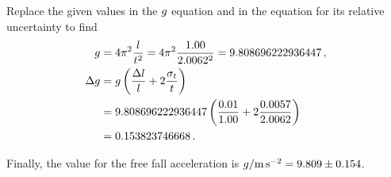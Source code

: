 Replace the given values in the $\grav$ equation and in the equation for its relative uncertainty to find
%
\begin{align*}
    \grav &= 4\pi^2\dfrac{\length}{\period^2} 
          = 4\pi^2\dfrac{1.00}{2.0062^2}
          = 9.808696222936447\,,\\
%
    \muncer\grav &= \grav\left(\dfrac{\muncer\length}{\length} + 2\dfrac{\sstdev_\period}{\period}\right)\\
                 &= 9.808696222936447\left(\dfrac{0.01}{1.00} + 2\dfrac{0.0057}{2.0062}\right)\\
                 &= 0.153823746668\,.
\end{align*}

Finally, the value for the free fall acceleration is $\grav/\si{m.s^{-2}} = 9.809 \pm 0.154$.

